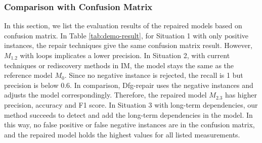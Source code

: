 \subsubsection{Comparison with Confusion Matrix}
In this section, we list the evaluation results of the repaired models based on confusion matrix. In Table \ref{tab:demo-result}, for Situation 1 with only positive instances, the repair techniques give the same confusion matrix result. However,  $M_{1.2}$  with loops implicates a lower precision. In Situation 2, with current techniques or rediscovery methods in IM, the model stays the same as the reference  model $M_0$. Since no negative instance is rejected, the recall is 1 but precision is below 0.6.  In comparison, Dfg-repair uses the negative instances and adjusts the model correspondingly. Therefore, the repaired model $M_{2.3}$ has  higher precision, accuracy and F1 score. In Situation 3 with long-term dependencies, our method succeeds to detect and add the  long-term dependencies in the model. In this way, no false positive or false negative instances are in the confusion matrix, and the repaired model holds the highest values for all listed measurements.
